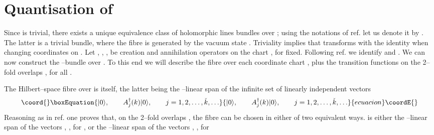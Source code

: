 \documentclass[a4paper,a4paper]{article}
\begin{document}
\section{Quantisation of \coordHE{}}\label{cepehache}


Since \coordHE{} is trivial, there exists a unique equivalence class 
of holomorphic lines bundles over \coordHE{}; using the notations of ref. \cite{PQM} 
let us denote it by \coordHE{}. The latter is a trivial bundle, 
where the fibre \coordHE{} is generated by the vacuum state \myHighlight{$\vert 0\rangle$}\coordHE{}.
Triviality implies that \myHighlight{$\vert 0\rangle$}\coordHE{} transforms with the identity when changing coordinates 
on \coordHE{}. Let \coordHE{}, \coordHE{}, \coordHE{}, 
be creation and annihilation operators on the chart \coordHE{}, for \coordHE{} fixed. 
Following ref. \cite{PQM} we identify \coordHE{} and 
\coordHE{}. We can now construct the \coordHE{}--bundle over 
\coordHE{}. To this end we will describe the fibre over each coordinate chart 
\coordHE{}, plus the transition functions on the 2--fold overlaps \coordHE{}, 
for all \coordHE{}. 

The Hilbert--space fibre over \coordHE{} is \coordHE{} itself, the latter being the 
\coordHE{}--linear span of the infinite set of linearly independent vectors 
\begin{equation}\coord{}\boxEquation{
\vert 0\rangle,\qquad A^{\dagger}_j(k)\vert 0\rangle,\qquad 
j=1, 2, \ldots, \check k, \ldots
\label{nnumm}
}{
\vert 0\rangle,\qquad A^{\dagger}_j(k)\vert 0\rangle,\qquad 
j=1, 2, \ldots, \check k, \ldots
}{ecuacion}\coordE{}\end{equation}
Reasoning as in ref. \cite{PQM} one proves 
that, on the 2--fold overlaps \coordHE{}, the fibre \coordHE{} can be chosen 
in either of two equivalent ways.  \coordHE{} is either the \coordHE{}--linear span of the vectors 
\myHighlight{$\vert 0\rangle$}\coordHE{}, \coordHE{}, for
\coordHE{}, or the \coordHE{}--linear span of the vectors \myHighlight{$\vert 0\rangle$}\coordHE{}, 
\coordHE{}, for \coordHE{}
\end{document}

